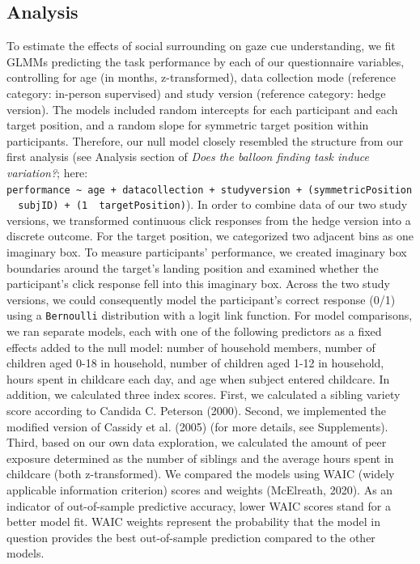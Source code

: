 \documentclass[
  man,floatsintext]{apa6}
\begin{document}
\hypertarget{analysis-2}{%
\subsection{Analysis}\label{analysis-2}}

To estimate the effects of social surrounding on gaze cue understanding, we fit GLMMs predicting the task performance by each of our questionnaire variables, controlling for age (in months, z-transformed), data collection mode (reference category: in-person supervised) and study version (reference category: hedge version). The models included random intercepts for each participant and each target position, and a random slope for symmetric target position within participants. Therefore, our null model closely resembled the structure from our first analysis (see Analysis section of \emph{Does the balloon finding task induce variation?}; here: \texttt{performance\ \textasciitilde{}\ age\ +\ datacollection\ +\ studyversion\ +\ (symmetricPosition\ \textbar{}\ subjID)\ +\ (1\ \textbar{}\ targetPosition)}).
In order to combine data of our two study versions, we transformed continuous click responses from the hedge version into a discrete outcome. For the target position, we categorized two adjacent bins as one imaginary box. To measure participants' performance, we created imaginary box boundaries around the target's landing position and examined whether the participant's click response fell into this imaginary box. Across the two study versions, we could consequently model the participant's correct response (0/1) using a \texttt{Bernoulli} distribution with a logit link function.
For model comparisons, we ran separate models, each with one of the following predictors as a fixed effects added to the null model: number of household members, number of children aged 0-18 in household, number of children aged 1-12 in household, hours spent in childcare each day, and age when subject entered childcare.
In addition, we calculated three index scores. First, we calculated a sibling variety score according to Candida C. Peterson (2000). Second, we implemented the modified version of Cassidy et al. (2005) (for more details, see Supplements). Third, based on our own data exploration, we calculated the amount of peer exposure determined as the number of siblings and the average hours spent in childcare (both z-transformed).
We compared the models using WAIC (widely applicable information criterion) scores and weights (McElreath, 2020). As an indicator of out-of-sample predictive accuracy, lower WAIC scores stand for a better model fit. WAIC weights represent the probability that the model in question provides the best out-of-sample prediction compared to the other models.
\end{document}
